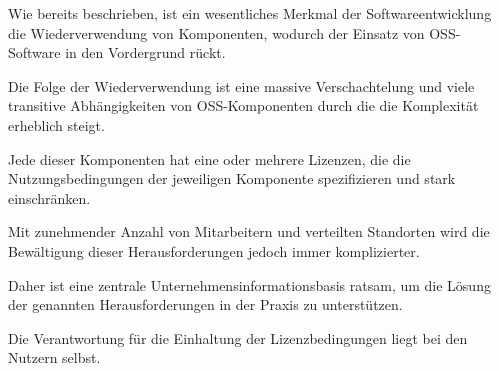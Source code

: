 Wie bereits beschrieben, ist ein wesentliches Merkmal der Softwareentwicklung die Wiederverwendung von Komponenten, wodurch der Einsatz von OSS-Software in den Vordergrund rückt. 

Die Folge der Wiederverwendung ist eine massive Verschachtelung und viele transitive Abhängigkeiten von OSS-Komponenten durch die die Komplexität erheblich steigt. 

Jede dieser Komponenten hat eine oder mehrere Lizenzen, die die Nutzungsbedingungen der jeweiligen Komponente spezifizieren und stark einschränken.  

Mit zunehmender Anzahl von Mitarbeitern und verteilten Standorten wird die Bewältigung dieser Herausforderungen jedoch immer komplizierter. 

Daher ist eine zentrale Unternehmensinformationsbasis ratsam, um die Lösung der genannten Herausforderungen in der Praxis zu unterstützen.

Die Verantwortung für die Einhaltung der Lizenzbedingungen liegt bei den Nutzern selbst.
